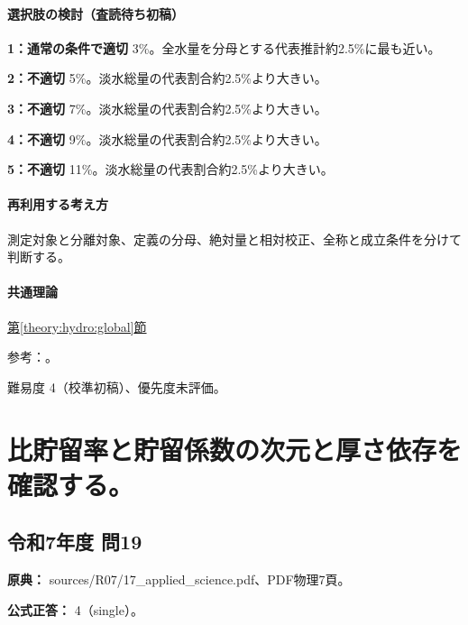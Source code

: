 \paragraph{選択肢の検討（査読待ち初稿）}\mbox{}\par

\noindent\textbf{1：通常の条件で適切} 3\%。全水量を分母とする代表推計約2.5\%に最も近い。\par

\noindent\textbf{2：不適切} 5\%。淡水総量の代表割合約2.5\%より大きい。\par

\noindent\textbf{3：不適切} 7\%。淡水総量の代表割合約2.5\%より大きい。\par

\noindent\textbf{4：不適切} 9\%。淡水総量の代表割合約2.5\%より大きい。\par

\noindent\textbf{5：不適切} 11\%。淡水総量の代表割合約2.5\%より大きい。\par

\paragraph{再利用する考え方} 測定対象と分離対象、定義の分母、絶対量と相対校正、全称と成立条件を分けて判断する。

\paragraph{共通理論} \hyperref[theory:hydro:global]{第\ref*{theory:hydro:global}節}

\par 参考：\cite{analysis49_fresh_ref}。

\par 難易度 4（校準初稿）、優先度未評価。

\section{比貯留率と貯留係数の次元と厚さ依存を確認する。}

\subsection{令和7年度 問19}
\label{q:r07-reg-applied-19}

\noindent\textbf{原典：} sources/R07/17\_applied\_science.pdf、PDF物理7頁。

\textbf{公式正答：} 4（single）。

